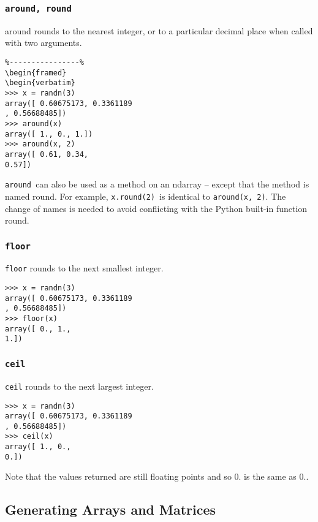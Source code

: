 \documentclass[KSmain.tex]{subfiles}
\begin{document}
\subsubsection*{\texttt{around, round}}
around rounds to the nearest integer, or to a particular decimal place when called with two arguments.
\begin{framed}
\begin{verbatim}
%----------------%
\begin{framed}
\begin{verbatim}
>>> x = randn(3)
array([ 0.60675173, 0.3361189
, 0.56688485])
>>> around(x)
array([ 1., 0., 1.])
>>> around(x, 2)
array([ 0.61, 0.34,
0.57])
\end{verbatim}
\end{framed}
\texttt{around }can also be used as a method on an ndarray – except that the method is named round. For example,
\texttt{x.round(2) }is identical to \texttt{around(x, 2)}. The change of names is needed to avoid conflicting with the
Python built-in function round.
\subsubsection*{\texttt{floor}}
\texttt{floor} rounds to the next smallest integer.
\begin{framed}
\begin{verbatim}
>>> x = randn(3)
array([ 0.60675173, 0.3361189
, 0.56688485])
>>> floor(x)
array([ 0., 1.,
1.])
\end{verbatim}
\end{framed}
\subsubsection*{\texttt{ceil}}
\texttt{ceil} rounds to the next largest integer.
\begin{framed}
\begin{verbatim}
>>> x = randn(3)
array([ 0.60675173, 0.3361189
, 0.56688485])
>>> ceil(x)
array([ 1., 0.,
0.])
\end{verbatim}
\end{framed}
Note that the values returned are still floating points and so 0.
is the same as 0..



\subsection{Generating Arrays and Matrices}
\end{document}
